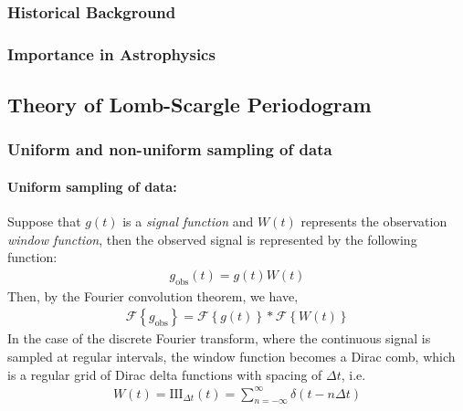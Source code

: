     		\subsubsection{Historical Background}
    		
    		\subsubsection{Importance in Astrophysics}
    	
    	\subsection{Theory of Lomb-Scargle Periodogram}
    	
    		\subsubsection{Uniform and non-uniform sampling of data}
    			\paragraph{Uniform sampling of data:}
    			Suppose that $g(t)$ is a \textit{signal function} and $W(t)$ represents the observation \textit{window function}, then the observed signal is represented by the following function:
    			\begin{align}
    				g_\text{obs}(t)=g(t)W(t) \label{eqn:obs-func}
    			\end{align}
    			Then, by the Fourier convolution theorem, we have,
    			\begin{align}
    				\mathscr{F}\left\lbrace g_\text{obs} \right\rbrace = \mathscr{F}\left\lbrace g(t) \right\rbrace * \mathscr{F}\left\lbrace W(t) \right\rbrace \label{eqn:FT-obs-func}
    			\end{align}
    			In the case of the discrete Fourier transform, where the continuous signal is sampled at regular intervals, the window function becomes a Dirac comb, which is a regular grid of Dirac delta functions with spacing of $\Delta t$, i.e.
    			\begin{align}
    				W(t)=\text{III}_{\Delta t}(t)=\sum_{n=-\infty}^{\infty}{\delta(t-n\Delta t)} \label{eqn:dirac-comb}
    			\end{align}
    			
